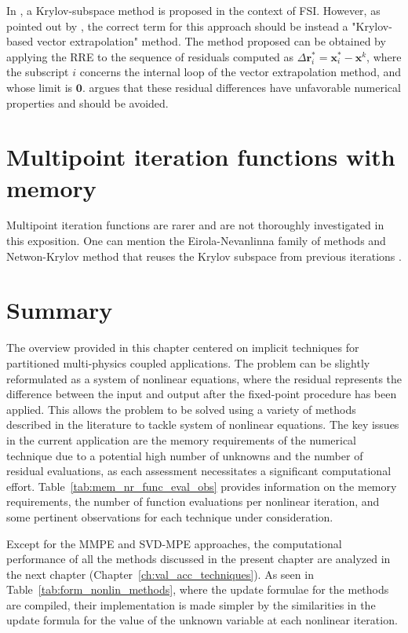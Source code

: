 In \cite{michler_interface_2005}, a Krylov-subspace method is proposed in the context of FSI.
However, as pointed out by \cite{kuttler_vector_2009}, the correct term for this approach should be instead a "Krylov-based vector extrapolation" method.
The method proposed can be obtained by applying the RRE to the sequence of residuals computed as
\(\Delta \mathbf r^*_i = \mathbf x^*_i - \mathbf x^k\), where the subscript \(i\) concerns the internal loop of the vector extrapolation method, and whose limit is \(\mathbf 0\).
\cite{kuttler_vector_2009} argues that these residual differences have unfavorable numerical properties and should be avoided.



\section{Multipoint iteration functions with memory}

Multipoint iteration functions are rarer and are not thoroughly investigated in this exposition.
One can mention the Eirola-Nevanlinna family of methods \citep{fang_two_2009} and Netwon-Krylov method that reuses the Krylov subspace from previous iterations \citep{sidi_vector_2017}.

\section{Summary}

The overview provided in this chapter centered on implicit techniques for partitioned multi-physics coupled applications.
The problem can be slightly reformulated as a system of nonlinear equations, where the residual represents the difference between the input and output after the fixed-point procedure has been applied.
This allows the problem to be solved using a variety of methods described in the literature to tackle system of nonlinear equations.
The key issues in the current application are the memory requirements of the numerical technique due to a potential high number of unknowns and the number of residual evaluations, as each assessment necessitates a significant computational effort.
Table~\ref{tab:mem_nr_func_eval_obs} provides information on the memory requirements, the number of function evaluations per nonlinear iteration, and some pertinent observations for each technique under consideration.

Except for the MMPE and SVD-MPE approaches, the computational performance of all the methods discussed in the present chapter are analyzed in the next chapter (Chapter~\ref{ch:val_acc_techniques}).
As seen in Table~\ref{tab:form_nonlin_methods}, where the update formulae for the methods are compiled, their implementation is made simpler by the similarities in the update formula for the value of the unknown variable at each nonlinear iteration.


